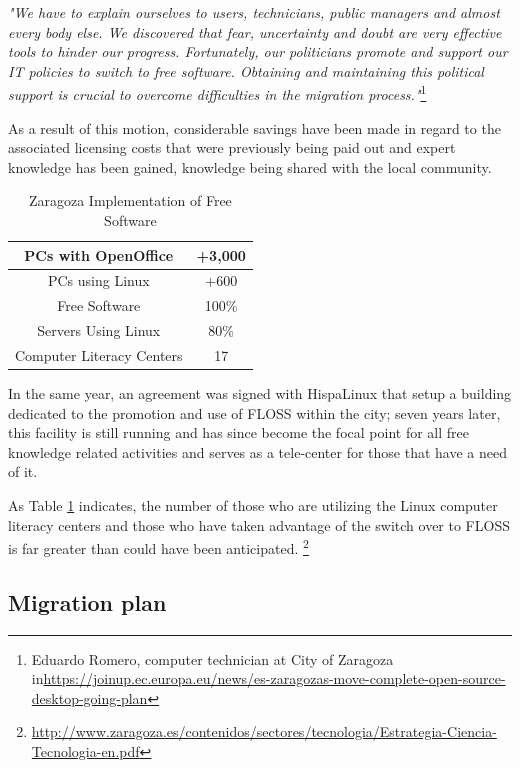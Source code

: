 \textit{"We have to explain ourselves to users, technicians, public managers and almost every body else. We discovered that fear, uncertainty and doubt are very effective tools to hinder our progress. Fortunately, our politicians promote and support our IT policies to switch to free software. Obtaining and maintaining this political support is crucial to overcome difficulties in the migration process."}\footnote{Eduardo Romero, computer technician at City of Zaragoza in\url{https://joinup.ec.europa.eu/news/es-zaragozas-move-complete-open-source-desktop-going-plan}}

As a result of this motion, considerable savings have been made in regard to the associated licensing costs that were previously being paid out and expert knowledge has been gained, knowledge being shared with the local community. 
\begin{table}[H] \centering

\begin{tabular}{| c| c |}
\hline
PCs with OpenOffice & +3,000\\\hline
PCs using Linux   & +600  \\ \hline
Free Software      & 100\%  \\ \hline
Servers Using Linux  & 80\% \\ \hline
Computer Literacy Centers & 17   \\
\hline
\end{tabular}
\caption{Zaragoza Implementation of Free Software}
\label{table:Zaragoza implementation}
\end{table}
In the same year, an agreement was signed with HispaLinux that setup a building dedicated to the promotion and use of   FLOSS within the city; seven years later, this facility is still running and has since become the focal point for all free knowledge related activities and serves as a tele-center for those that have a need of it.

As Table \ref{table:Zaragoza implementation} indicates, the number of those who are utilizing the Linux computer literacy centers and those who have taken advantage of the switch over to FLOSS is far greater than could have been anticipated. \footnote{\url{http://www.zaragoza.es/contenidos/sectores/tecnologia/Estrategia-Ciencia-Tecnologia-en.pdf}}


\subsection{Migration plan}


